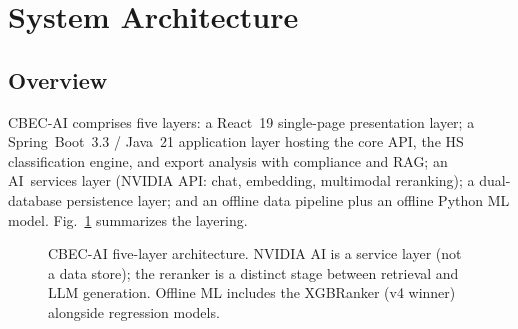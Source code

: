\documentclass[conference]{IEEEtran}
\begin{document}
\section{System Architecture}

\subsection{Overview}
CBEC-AI comprises five layers: a React~19 single-page presentation layer;
a Spring~Boot~3.3 / Java~21 application layer hosting the core API, the HS
classification engine, and export analysis with compliance and RAG; an
AI~services layer (NVIDIA API: chat, embedding, multimodal reranking); a
dual-database persistence layer; and an offline data pipeline plus an
offline Python ML model. Fig.~\ref{fig:arch} summarizes the layering.

\begin{figure}[t]
\centering
{}
\caption{CBEC-AI five-layer architecture. NVIDIA AI is a service layer
(not a data store); the reranker is a distinct stage between retrieval and
LLM generation. Offline ML includes the XGBRanker (v4 winner) alongside
regression models.}
\label{fig:arch}
\end{figure}
\end{document}
